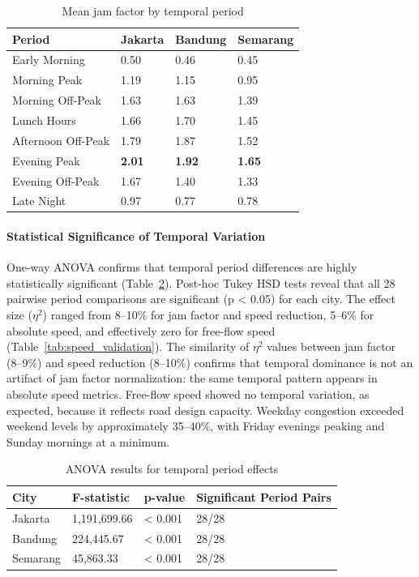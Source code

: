 \documentclass[review,authoryear]{elsarticle}
\begin{document}
\begin{longtable}[]{@{}llll@{}}
\caption{Mean jam factor by temporal period}\label{tab:table6_meanjam}\\
\toprule\noalign{}
Period & Jakarta & Bandung & Semarang \\
\midrule\noalign{}
\endhead
\bottomrule\noalign{}
\endlastfoot
Early Morning & 0.50 & 0.46 & 0.45 \\
Morning Peak & 1.19 & 1.15 & 0.95 \\
Morning Off-Peak & 1.63 & 1.63 & 1.39 \\
Lunch Hours & 1.66 & 1.70 & 1.45 \\
Afternoon Off-Peak & 1.79 & 1.87 & 1.52 \\
Evening Peak & \textbf{2.01} & \textbf{1.92} & \textbf{1.65} \\
Evening Off-Peak & 1.67 & 1.40 & 1.33 \\
Late Night & 0.97 & 0.77 & 0.78 \\
\end{longtable}

\paragraph{Statistical Significance of Temporal Variation}

One-way ANOVA confirms that temporal period differences are highly statistically significant (Table~\ref{tab:table_anova}). Post-hoc Tukey HSD tests reveal that all 28 pairwise period comparisons are significant (p < 0.05) for each city. The effect size ($\eta^2$) ranged from 8--10\% for jam factor and speed reduction, 5--6\% for absolute speed, and effectively zero for free-flow speed (Table~\ref{tab:speed_validation}). The similarity of $\eta^2$ values between jam factor (8--9\%) and speed reduction (8--10\%) confirms that temporal dominance is not an artifact of jam factor normalization: the same temporal pattern appears in absolute speed metrics. Free-flow speed showed no temporal variation, as expected, because it reflects road design capacity. Weekday congestion exceeded weekend levels by approximately 35--40\%, with Friday evenings peaking and Sunday mornings at a minimum.

\begin{longtable}[]{@{}llll@{}}
\caption{ANOVA results for temporal period effects}\label{tab:table_anova}\\
\toprule\noalign{}
City & F-statistic & p-value & Significant Period Pairs \\
\midrule\noalign{}
\endhead
\bottomrule\noalign{}
\endlastfoot
Jakarta & 1,191,699.66 & < 0.001 & 28/28 \\
Bandung & 224,445.67 & < 0.001 & 28/28 \\
Semarang & 45,863.33 & < 0.001 & 28/28 \\
\end{longtable}
\end{document}
